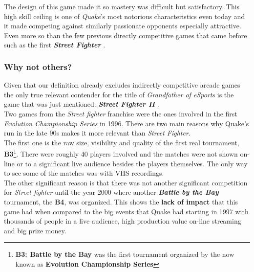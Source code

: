 The design of this game made it so mastery was difficult but satisfactory. This high skill ceiling is one of \textit{Quake}'s most notorious characteristics even today and it made competing against similarly passionate opponents especially attractive. Even more so than the few previous directly competitive games that came before such as the first \textit{\textbf{Street Fighter}} \citep{game:streetfighter2}.\\

\subsubsection{Why not others?}

Given that our definition already excludes indirectly competitive arcade games the only true relevant contender for the title of \textit{Grandfather of eSports} is the game that was just mentioned: \textbf{\textit{Street Fighter II}} \citep{game:streetfighter2}.\\

Two games from the \textit{Street fighter} franchise were the ones involved in the first \textit{Evolution Championship Series} in 1996. There are two main reasons why Quake's run in the late 90s makes it more relevant than \textit{Street Fighter}.\\

The first one is the raw size, visibility and quality of the first real tournament, \textbf{B3}\footnote{\textbf{B3: Battle by the Bay}\citep{evo} was the first tournament organized by the now known as \textbf{Evolution Championship Series}}. There were roughly 40 players involved and the matches were not shown on-line or to a significant live audience besides the players themselves. The only way to see some of the matches was with VHS recordings.\\

The other significant reason is that there was not another significant competition for \textit{Street fighter} until the year 2000 where another \textit{\textbf{Battle by the Bay}} tournament, the \textbf{B4}, was organized. This shows the \textbf{lack of impact} that this game had when compared to the big events that Quake had starting in 1997 with thousands of people in a live audience, high production value on-line streaming and big prize money.





